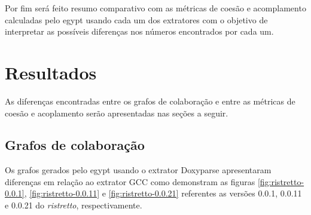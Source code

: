 Por fim será feito resumo comparativo com as métricas de coesão e acomplamento
calculadas pelo egypt usando cada um dos extratores com o objetivo de
interpretar as possíveis diferenças nos números encontrados por cada um.

\section{Resultados}

As diferenças encontradas entre os grafos de colaboração e entre as métricas
de coesão e acoplamento serão apresentadas nas seções a seguir.

\subsection{Grafos de colaboração}

Os grafos gerados pelo egypt usando o extrator Doxyparse apresentaram
diferenças em relação ao extrator GCC como demonstram as figuras
\ref{fig:ristretto-0.0.1}, \ref{fig:ristretto-0.0.11} e
\ref{fig:ristretto-0.0.21} referentes as versões 0.0.1, 0.0.11 e 0.0.21 do {\it
ristretto}, respectivamente.

